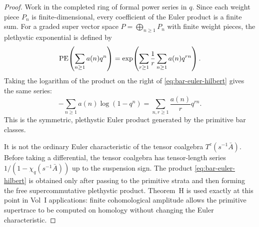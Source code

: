 \begin{proof}
Work in the completed ring of formal power series in $q$.  Since each
weight piece $P_n$ is finite-dimensional, every coefficient of the
Euler product is a finite sum.  For a graded super vector space
$P=\bigoplus_{n\geq 1}P_n$ with finite weight pieces, the plethystic
exponential is defined by
\[
 \operatorname{PE}\!\left(\sum_{n\geq 1} a(n)q^n\right)
 =
 \exp\!\left(
   \sum_{r\geq 1}\frac{1}{r}\sum_{n\geq 1}a(n)q^{rn}
 \right).
\]
Taking the logarithm of the product on the right of
\eqref{eq:bar-euler-hilbert} gives the same series:
\[
 -\sum_{n\geq 1}a(n)\log(1-q^n)
 =
 \sum_{n,r\geq 1}\frac{a(n)}{r}q^{rn}.
\]
This is the symmetric, plethystic Euler product generated by the
primitive bar classes.

It is not the ordinary Euler characteristic of the tensor coalgebra
$T^c(s^{-1}\bar A)$.  Before taking a differential, the tensor
coalgebra has tensor-length series
$1/(1-\chi_q(s^{-1}\bar A))$ up to the suspension sign.  The product
\eqref{eq:bar-euler-hilbert} is obtained only after passing to the
primitive strata and then forming the free supercommutative
plethystic product.  Theorem~H is used exactly at this point in
Vol~I applications: finite cohomological amplitude allows the
primitive supertrace to be computed on homology without changing the
Euler characteristic.
\end{proof}

